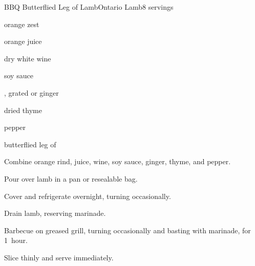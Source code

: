 \begin{recipe}{BBQ Butterflied Leg of Lamb}{Ontario Lamb}{8 servings}

\begin{ingredients}
\item {} orange zest
\item \C{\half} orange juice
\item \C{\half} dry white wine
\item \C{\quarter} soy sauce
\item {} , grated  or  ginger
\item {} dried thyme
\item \tp{\quarter} pepper
\item {} butterflied leg of 
\end{ingredients}

\begin{directions}
\item Combine orange rind, juice, wine, soy sauce, ginger, thyme, and pepper.
\item Pour over lamb in a pan or resealable bag.
\item Cover and refrigerate overnight, turning occasionally.
\item Drain lamb, reserving marinade.
\item Barbecue on greased grill, turning occasionally and basting with marinade, for 1~hour.
\item Slice thinly and serve immediately.
\end{directions}

\end{recipe}
